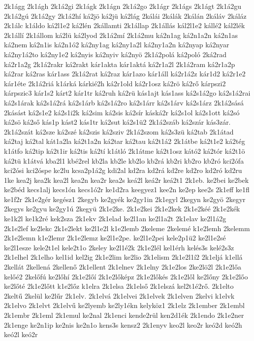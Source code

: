 {2k1ágg
2k1ágh
2k1á2gi
2k1ágk
2k1ágn
2k1á2go
2k1ágr
2k1ágs
2k1ágt
2k1á2gu
2k1á2gú
2k1á2gy
2k1á2hí
ká2jö
ká2jü
ká2lág
2kálái
2kálák
2kálán
2káláv
2káláz
2k1álc
k1áldo
ká2l1e2
ká2lén
2kállamti
2k1állap
2k1állás
kál2l1e2
kállé2
kál2lék
2k1állí
2k1állom
ká2lü
ká2lyod
2k1á2mí
2k1á2mu
ká2n1ag
ká2n1a2n
ká2n1as
ká2nem
ká2n1is
ká2n1ó2
ká2ny1ag
ká2ny1a2l
ká2ny1a2n
ká2nyap
ká2nyar
ká2ny1á2to
ká2ny1e2
ká2nyis
ká2nyiv
ká2nyö
2k1á2polá
ká2poló
2ká2rad
ká2r1a2g
2k1á2rakr
ká2rakt
kár1akta
kár1aktá
ká2r1a2l
2k1á2ram
ká2r1a2p
ká2rar
ká2ras
kár1ass
2k1á2rat
ká2raz
kár1azo
kár1áll
ká2r1á2z
kár1d2
ká2r1e2
kár1éte
2k1á2riá
k1árká
kárkié2h
ká2r1old
ká2r1osz
ká2rö
ká2rő
kárpszi2
kárpszic3
kár1s2
kárt2
kár1tr
ká2ruh
ká2rü
kás1ajt
kás1ass
ká2s1á2go
ká2s1á2rai
ká2s1árak
ká2s1á2rá
ká2s1árb
ká2s1á2ro
ká2s1árr
ká2s1árv
ká2s1árz
2k1á2sásá
2kásást
ká2s1e2
ká2s1i2k
ká2sim
ká2sis
ká2sír
káská2r
ká2s1ol
ká2s1ott
ká2só
ká2sö
ká2ső
kás1p
kást2
kás1tr
ká2sut
ká2s1ü2
2k1á2száb
ká2szár
kás3zár.
2k1á2szát
ká2sze
ká2szé
ká2szis
ká2sziv
2k1á2szom
ká2s3zü
ká2tab
2k1átad
ká2taj
ká2tal
kát1a2la
ká2t1a2n
ká2tar
ká2tau
ká2t1á2
2k1átbe
ká2t1e2
ká2tég
k1átfo
ká2tip
ká2t1ir
ká2tis
ká2tí
k1átló
2k1átme
ká2t1osz
kátó2
ká2tór
ká2t1ö
ká2tü
k1átvá
kba2l1
kbé2rel
kb2la
kb2le
kb2lo
kb2rá
kb2ri
kb2ro
kb2ró
kci2ófa
kci2ósi
kci2óspe
kc2lu
kcsa2p1á2g
kdi2al
kd2ra
kd2rá
kd2re
kd2ro
kd2ró
kd2ru
1ke
kea2j
kea2k
kea2l
kea2n
kea2r
kea2s
keá2l
keá2r
keá2t1
2k1eb.
ke2bei
ke2bek
ke2béd
kecs1alj
kecs1ón
kecs1ó2r
ke1d2ra
keegyez1
kee2n
ke2ep
kee2s
2k1eff
ke1fl
ke1f2r
2k1e2gér
kegész1
2kegyb
ke2gyék
ke2gy1in
2k1egyl
2kegyn
ke2gyö
2kegyr
2kegys
ke2gyu
ke2gy1ú
2kegyü
2k1e2ke.
2k1e2kei
2k1e2kek
2k1e2kéé
2k1e2kék
ke1k2l
ke1k2ré
kek2sza
2k1ekv
2k1elad
ke2l1an
ke2l1a2t
2k1elav
ke2l1á2g
2k1e2lef
ke2lekc
2k1e2lekt
ke2l1e2l
k1e2lemb
2keleme
2kelemé
k1e2lemh
2kelemm
2k1e2lemn
k1e2lemr
2k1e2lemz
ke2l1e2pe.
ke2l1e2pei
kele2p1ü2
ke2l1e2sé
ke2l1esze
kele2t1el
kele2t1o
2keley
ke2l1é2k
2k1e2lél
kel1érh
kelés3s
kelé2s3z
2k1elhel
2k1elho
kel1id
kel2ig
2k1e2lim
ke2lio
2k1elism
2k1e2l1í2
2k1eljá
k1ellá
2kellát
2kellená
2kellenő
2k1ellent
2k1elnev
2k1elny
2k1e2los
2ke2lö2l
2k1e2lőa
kelőé2
2kelőfú
ke2lőhí
2k1e2lőí
2k1e2lőképz
2k1e2lőkés
2k1e2lől
ke2lőny
2k1e2lőo
ke2lőté
2k1e2lőtt
k1e2lőz
k1elra
2k1elsa
2k1első
2k1elszá
kel2t1é2rő.
2k1elto
2keltű
2kelül
ke2lűr
2k1elv.
2k1elvá
2k1elvei
2k1elvek
2k1elven
2kelvi
k1elvk
2k1elvo
2k1elvt
2k1elvű
ke2lyemb
ke2ly1ékn
kelyköz1
2k1elz
2k1ember
2k1embl
2k1embr
2k1eml
2k1emul
ke2nal
2k1enci
kende2rül
ken2d1ék
2k1endo
2k1e2ner
2k1enge
ke2n1ip
ke2nis
ke2n1o
kens3s
kensz2
2k1enyv
keo2l
keo2r
keó2d
keó2h
keó2l
keó2r
}
